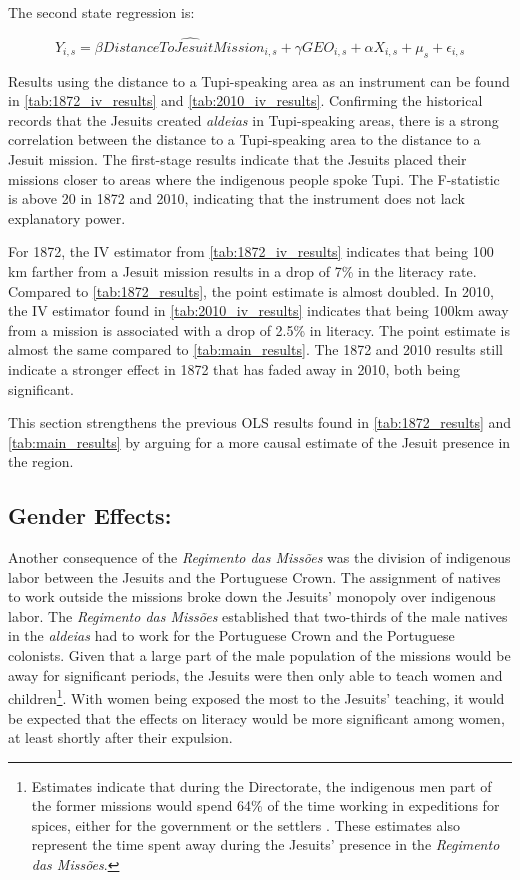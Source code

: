 \documentclass{article}
\begin{document}
The second state regression is:

\begin{equation}
\label{eqn:ivequation}
	Y_{i,s} = \beta \widehat{\textit{DistanceToJesuitMission}_{i,s}} + \gamma \textit{GEO}_{i,s} +  \alpha \textit{X}_{i,s} + \mu_s + \epsilon_{i,s}
\end{equation}

Results using the distance to a Tupi-speaking area as an instrument can be found in \autoref{tab:1872_iv_results} and \autoref{tab:2010_iv_results}. Confirming the historical records that the Jesuits created \textit{aldeias} in Tupi-speaking areas, there is a strong correlation between the distance to a Tupi-speaking area to the distance to a Jesuit mission. 
The first-stage results indicate that the Jesuits placed their missions closer to areas where the indigenous people spoke Tupi. 
The F-statistic is above 20 in 1872 and 2010, indicating that the instrument does not lack explanatory power. 

For 1872, the IV estimator from \autoref{tab:1872_iv_results} indicates that being 100 km farther from a Jesuit mission results in a drop of 7\% in the literacy rate. 
Compared to \autoref{tab:1872_results}, the point estimate is almost doubled. In 2010, the IV estimator found in \autoref{tab:2010_iv_results} indicates that being 100km away from a mission is associated with a drop of 2.5\% in literacy. 
The point estimate is almost the same compared to \autoref{tab:main_results}. 
The 1872 and 2010 results still indicate a stronger effect in 1872 that has faded away in 2010, both being significant. 

This section strengthens the previous OLS results found in \autoref{tab:1872_results} and \autoref{tab:main_results} by arguing for a more causal estimate of the Jesuit presence in the region. 

\subsection{Gender Effects:}

Another consequence of the \textit{Regimento das Missões} was the division of indigenous labor between the Jesuits and the Portuguese Crown. 
The assignment of natives to work outside the missions broke down the Jesuits' monopoly over indigenous labor. 
The \textit{Regimento das Missões} established that two-thirds of the male natives in the \textit{aldeias} had to work for the Portuguese Crown and the Portuguese colonists. 
Given that a large part of the male population of the missions would be away for significant periods, the Jesuits were then only able to teach women and children\footnote{
  Estimates indicate that during the Directorate, the indigenous men part of the former missions would spend 64\% of the time working in expeditions for spices, either for the government or the settlers \parencite{Hemming1987-vj}. 
These estimates also represent the time spent away during the Jesuits' presence in the \textit{Regimento das Missões}.}. 
With women being exposed the most to the Jesuits' teaching, it would be expected that the effects on literacy would be more significant among women, at least shortly after their expulsion. 
\end{document}
